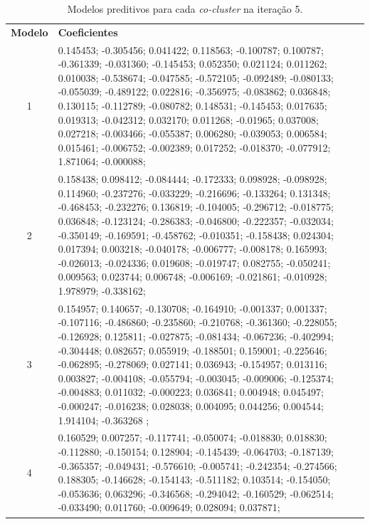 \FloatBarrier

\FloatBarrier
{\footnotesize
\begin{longtable}[h]{| c | p{} |} 

	\caption{\label{scoal:coef} Modelos preditivos para cada \textit{co-cluster}
	na iteração 5.}	\\
					
	\hline
	\textbf{Modelo} & \textbf{Coeficientes} \\ \hhline{|=|=|}
	1 & 0.145453; -0.305456; 0.041422; 0.118563; -0.100787; 0.100787; -0.361339;
	 -0.031360; -0.145453; 0.052350; 0.021124; 0.011262; 0.010038;
	-0.538674; -0.047585; -0.572105; -0.092489; -0.080133; -0.055039; -0.489122; 0.022816;
	-0.356975; -0.083862; 0.036848; 0.130115; -0.112789; -0.080782; 0.148531;
	-0.145453; 0.017635; 0.019313; -0.042312; 0.032170; 0.011268; -0.01965;
	0.037008; 0.027218; -0.003466; -0.055387; 0.006280; -0.039053; 0.006584;
	0.015461; -0.006752; -0.002389; 0.017252; -0.018370; -0.077912; 1.871064;
	-0.000088; \\ \hline
	2 & 0.158438; 0.098412; -0.084444; -0.172333; 0.098928; -0.098928; 0.114960;
	-0.237276; -0.033229; -0.216696; -0.133264; 0.131348; -0.468453; -0.232276;
	0.136819; -0.104005; -0.296712; -0.018775; 0.036848; -0.123124; -0.286383;
	-0.046800; -0.222357; -0.032034; -0.350149; -0.169591; -0.458762;
	-0.010351; -0.158438; 0.024304; 0.017394; 0.003218; -0.040178; -0.006777;
	-0.008178; 0.165993; -0.026013; -0.024336; 0.019608; -0.019747; 0.082755;
	-0.050241; 0.009563; 0.023744; 0.006748; -0.006169; -0.021861; -0.010928;
	1.978979; -0.338162; \\ \hline
	3 & 0.154957; 0.140657; -0.130708; -0.164910; -0.001337; 0.001337;
	-0.107116; -0.486860; -0.235860; -0.210768; -0.361360; -0.228055; -0.126928;
	0.125811; -0.027875; -0.081434; -0.067236; -0.402994; -0.304448; 0.082657;
	0.055919; -0.188501; 0.159001; -0.225646; -0.062895; -0.278069; 0.027141;
	0.036943; -0.154957; 0.013116; 0.003827; -0.004108; -0.055794; -0.003045;
	-0.009006; -0.125374; -0.004883; 0.011032; -0.000223; 0.036841; 0.004948;
	0.045497; -0.000247; -0.016238; 0.028038; 0.004095; 0.044256; 0.004544;
	1.914104; -0.363268 ; \\ \hline 
	4 & 0.160529; 0.007257; -0.117741; -0.050074; -0.018830; 0.018830; -0.112880;
	-0.150154; 0.128904; -0.145439; -0.064703; -0.187139; -0.365357; -0.049431;
	-0.576610; -0.005741; -0.242354; -0.274566; 0.188305; -0.146628; -0.154143;
	-0.511182; 0.103514; -0.154050; -0.053636; 0.063296; -0.346568; -0.294042;
	-0.160529; -0.062514; -0.033490; 0.011760; -0.009649; 0.028094; 0.037871;

\end{longtable}}

